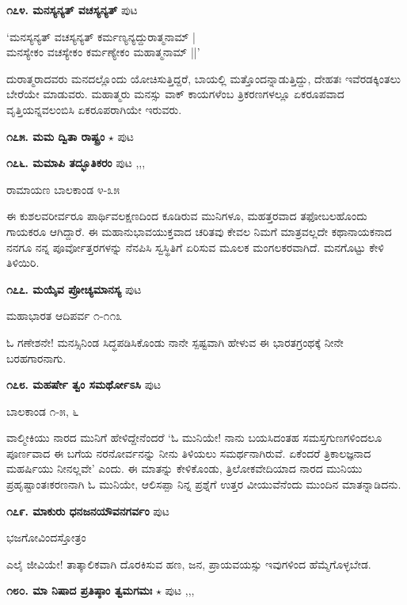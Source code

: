 \medskip
\noindent\textbf{೧೭೪. ಮನಸ್ಯನ್ಯತ್ ವಚಸ್ಯನ್ಯತ್} \hfill ಪುಟ \pageref{102}

\begin{shloka}
`ಮನಸ್ಯನ್ಯತ್ ವಚಸ್ಯನ್ಯತ್ ಕರ್ಮಣ್ಯನ್ಯದ್ದುರಾತ್ಮನಾಮ್ |\\
ಮನಸ್ಯೇಕಂ ವಚಸ್ಯೇಕಂ ಕರ್ಮಣ್ಯೇಕಂ ಮಹಾತ್ಮನಾಮ್ ||'
\end{shloka}

ದುರಾತ್ಮರಾದವರು ಮನದಲ್ಲೊಂದು ಯೋಚಿಸುತ್ತಿದ್ದರೆ, ಬಾಯಲ್ಲಿ ಮತ್ತೊಂದನ್ನಾಡುತ್ತಿದ್ದು, ದೇಹತಃ ಇವೆರಡಕ್ಕಿಂತಲು ಬೇರೆಯೇ ಮಾಡುವರು. ಮಹಾತ್ಮರು ಮನಸ್ಸು ವಾಕ್ ಕಾಯಗಳೆಂಬ ತ್ರಿಕರಣಗಳಲ್ಲೂ ಏಕರೂಪವಾದ ವೃತ್ತಿಯನ್ನವಲಂಬಿಸಿ ಏಕರೂಪರಾಗಿಯೇ ಇರುವರು.

\medskip
\noindent\textbf{೧೭೫. ಮಮ ದ್ವಿತಾ ರಾಷ್ಟ್ರಂ} $\star$ \hfill ಪುಟ \pageref{148a}

\medskip
\noindent\textbf{೧೭೬. ಮಮಾಪಿ ತದ್ಭೂತಿಕರಂ} \hfill ಪುಟ \pageref{159a},\pageref{168b},\pageref{193a},\pageref{211d}

\hfill ರಾಮಾಯಣ ಬಾಲಕಾಂಡ ೪-೩೫

ಈ ಕುಶಲವರೀರ್ವರೂ ಪಾರ್ಥಿವಲಕ್ಷಣದಿಂದ ಕೂಡಿರುವ ಮುನಿಗಳೂ, ಮಹತ್ತರವಾದ ತಫೋಬಲಹೊಂದು ಗಾಯಕರೂ ಆಗಿದ್ದಾರೆ. ಈ ಮಹಾನುಭಾವಯುಕ್ತವಾದ ಚರಿತವು ಕೇವಲ ನಿಮಗೆ ಮಾತ್ರವಲ್ಲದೇ ಕಥಾನಾಯಕನಾದ ನನಗೂ ನನ್ನ ಪೂರ್ವೋತ್ತರಗಳನ್ನು ನೆನಪಿಸಿ ಸ್ವಸ್ಥಿತಿಗೆ ಏರಿಸುವ ಮೂಲಕ ಮಂಗಲಕರವಾಗಿದೆ. ಮನಗೊಟ್ಟು ಕೇಳಿ ತಿಳಿಯಿರಿ.

\medskip
\noindent\textbf{೧೭೭. ಮಯೈವ ಪ್ರೋಚ್ಯಮಾನಸ್ಯ} \hfill ಪುಟ \pageref{119c}

\hfill ಮಹಾಭಾರತ ಆದಿಪರ್ವ ೧-೧೧೩

ಓ ಗಣೇಶನೇ! ಮನಸ್ಸಿನಿಂಡ ಸಿದ್ಧಪಡಿಸಿಕೊಂಡು ನಾನೇ ಸ್ಪಷ್ಟವಾಗಿ ಹೇಳುವ ಈ ಭಾರತಗ್ರಂಥಕ್ಕೆ ನೀನೇ ಬರಹಗಾರನಾಗು.

\medskip
\noindent\textbf{೧೭೮. ಮಹರ್ಷೇ ತ್ವಂ ಸಮರ್ಥೋಽಸಿ} \hfill ಪುಟ \pageref{246a}

\hfill ಬಾಲಕಾಂಡ ೧-೫, ೬

ವಾಲ್ಮೀಕಿಯು ನಾರದ ಮುನಿಗೆ ಹೇಳಿದ್ದೇನೆಂದರೆ `ಓ ಮುನಿಯೇ! ನಾನು ಬಯಸಿದಂತಹ ಸಮಸ್ತಗುಣಗಳಿಂದಲೂ ಪೂರ್ಣವಾದ ಈ ಬಗೆಯ ನರನೋರ್ವನನ್ನು ನೀನು ತಿಳಿಯಲು ಸಮರ್ಥನಾಗಿರುವೆ. ಏಕೆಂದರೆ ತ್ರಿಕಾಲಜ್ಞನಾದ ಮಹರ್ಷಿಯು ನೀನಲ್ಲವೇ' ಎಂದು. ಈ ಮಾತನ್ನು ಕೇಳಿಕೊಂಡು, ತ್ರಿಲೋಕವೇದಿಯಾದ ನಾರದ ಮುನಿಯು ಪ್ರಹೃಷ್ಟಾಂತಃಕರಣನಾಗಿ ಓ ಮುನಿಯೇ, ಆಲಿಸಪ್ಪಾ ನಿನ್ನ ಪ್ರಶ್ನೆಗೆ ಉತ್ತರ ವೀಯುವೆನೆಂದು ಮುಂದಿನ ಮಾತನ್ನಾಡಿದನು.

\medskip
\noindent\textbf{೧೭೯. ಮಾಕುರು ಧನಜನಯೌವನಗರ್ವಂ} \hfill ಪುಟ \pageref{60}

\hfill ಭಜಗೋವಿಂದಸ್ತೋತ್ರಂ 

ಎಲೈ ಜೀವಿಯೇ! ತಾತ್ಕಾಲಿಕವಾಗಿ ದೊರಕಿಸುವ ಹಣ, ಜನ, ಪ್ರಾಯವಯಸ್ಸು ಇವುಗಳಿಂದ ಹೆಮ್ಮೆಗೊಳ್ಳಬೇಡ.

\medskip
\noindent\textbf{೧೮೦. ಮಾ ನಿಷಾದ ಪ್ರತಿಷ್ಠಾಂ ತ್ವಮಗಮಃ} $\star$ \hfill ಪುಟ \pageref{20a},\pageref{157b},\pageref{166},\pageref{200}

